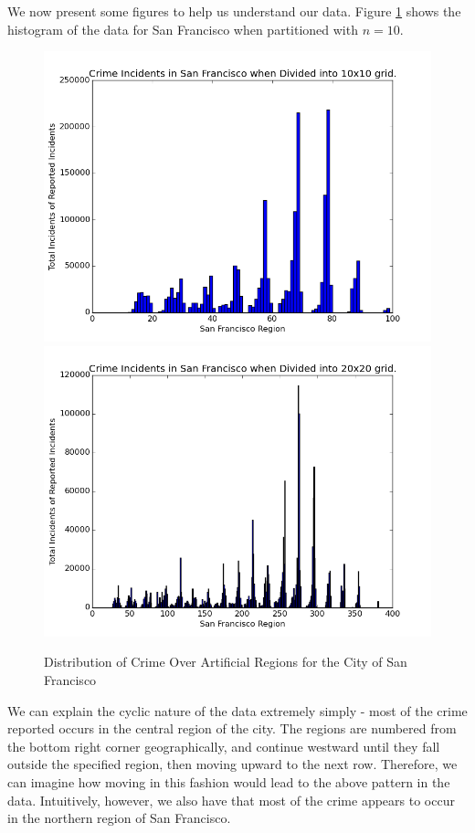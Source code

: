\documentclass[11pt]{article}
\begin{document}
We now present some figures to help us understand our data. Figure \ref{fig:sf_100} shows the histogram of the data for San Francisco when partitioned with $n=10$. \\
\begin{figure}[h!]
    \centering        
    \includegraphics[scale=0.4]{sf_n10.png}
    \includegraphics[scale=0.4]{sf_n20.png}
    \caption{Distribution of Crime Over Artificial Regions for the City of San Francisco}
    \label{fig:sf_100}
\end{figure}

We can explain the cyclic nature of the data extremely simply - most of the crime reported occurs in the central region of the city. The regions are numbered from the bottom right corner geographically, and continue westward until they fall outside the specified region, then moving upward to the next row. Therefore, we can imagine how moving in this fashion would lead to the above pattern in the data. Intuitively, however, we also have that most of the crime appears to occur in the northern region of San Francisco. \\
\end{document}
